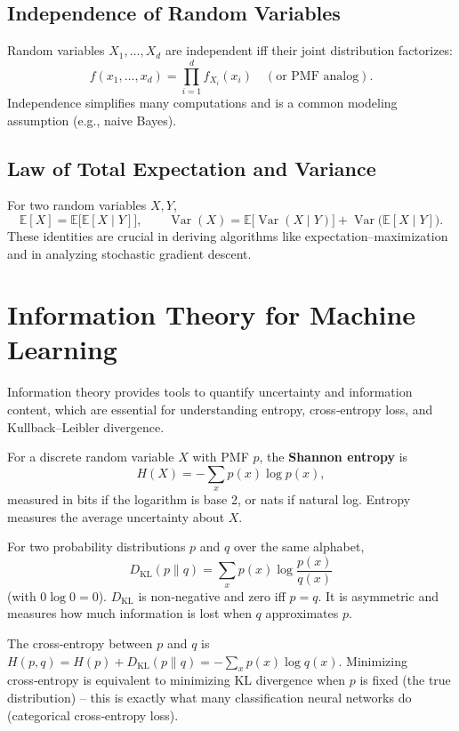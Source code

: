 \documentclass{tufte-handout}
\begin{document}
\subsection{Independence of Random Variables}
Random variables $X_1,\dots,X_d$ are independent iff their joint distribution factorizes:
\[
f(x_1,\dots,x_d) = \prod_{i=1}^d f_{X_i}(x_i) \quad (\text{or PMF analog}).
\]
Independence simplifies many computations and is a common modeling assumption (e.g., naive Bayes).

\subsection{Law of Total Expectation and Variance}
For two random variables $X,Y$,
\[
\mathbb{E}[X] = \mathbb{E}\bigl[\mathbb{E}[X \mid Y]\bigr],\qquad
\operatorname{Var}(X) = \mathbb{E}\bigl[\operatorname{Var}(X \mid Y)\bigr] + \operatorname{Var}\bigl(\mathbb{E}[X \mid Y]\bigr).
\]
These identities are crucial in deriving algorithms like expectation–maximization and in analyzing stochastic gradient descent.

\section{Information Theory for Machine Learning}

Information theory provides tools to quantify uncertainty and information content, which are essential for understanding entropy, cross‑entropy loss, and Kullback–Leibler divergence.

\begin{defn}[Entropy]
    For a discrete random variable $X$ with PMF $p$, the \textbf{Shannon entropy} is
    \[
    H(X) = -\sum_{x} p(x) \log p(x),
    \]
    measured in bits if the logarithm is base 2, or nats if natural log. Entropy measures the average uncertainty about $X$.
\end{defn}

\begin{defn}
    For two probability distributions $p$ and $q$ over the same alphabet,
    \[
    D_{\text{KL}}(p \parallel q) = \sum_x p(x) \log\frac{p(x)}{q(x)}
    \]
    (with $0\log0=0$). $D_{\text{KL}}$ is non‑negative and zero iff $p=q$. It is asymmetric and measures how much information is lost when $q$ approximates $p$.
\end{defn}

The cross‑entropy between $p$ and $q$ is $H(p,q) = H(p) + D_{\text{KL}}(p\parallel q) = -\sum_x p(x)\log q(x)$. Minimizing cross‑entropy is equivalent to minimizing KL divergence when $p$ is fixed (the true distribution) – this is exactly what many classification neural networks do (categorical cross‑entropy loss).
\end{document}
